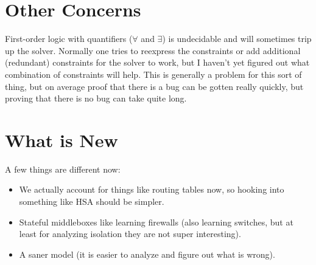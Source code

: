 \documentclass[11pt]{article}
\begin{document}
\section{Other Concerns}
First-order logic with quantifiers ($\forall$ and $\exists$) is
undecidable and will sometimes trip up the solver. Normally one tries to reexpress the constraints or add additional
(redundant) constraints for the solver to work, but I haven't yet figured out what combination of constraints will help.
This is generally a problem for this sort of thing, but on average proof that there is a bug can be gotten really
quickly, but proving that there is no bug can take quite long.

\section{What is New}
A few things are different now:
\begin{itemize}
\item We actually account for things like routing tables now, so hooking into something like HSA should be simpler.
\item Stateful middleboxes like learning firewalls (also learning switches, but at least for analyzing isolation they are
not super interesting).
\item A saner model (it is easier to analyze and figure out what is wrong).
\end{itemize}
\end{document}
